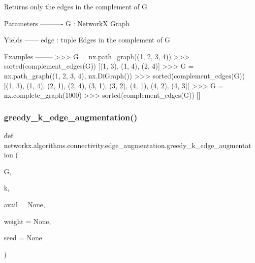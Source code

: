 \begin{DoxyVerb}Returns only the edges in the complement of G

Parameters
----------
G : NetworkX Graph

Yields
------
edge : tuple
    Edges in the complement of G

Examples
--------
>>> G = nx.path_graph((1, 2, 3, 4))
>>> sorted(complement_edges(G))
[(1, 3), (1, 4), (2, 4)]
>>> G = nx.path_graph((1, 2, 3, 4), nx.DiGraph())
>>> sorted(complement_edges(G))
[(1, 3), (1, 4), (2, 1), (2, 4), (3, 1), (3, 2), (4, 1), (4, 2), (4, 3)]
>>> G = nx.complete_graph(1000)
>>> sorted(complement_edges(G))
[]
\end{DoxyVerb}
 \mbox{\label{namespacenetworkx_1_1algorithms_1_1connectivity_1_1edge__augmentation_ac83e34bbae10a9475ed1ebdd7f31981e}} 
\subsubsection{\texorpdfstring{greedy\+\_\+k\+\_\+edge\+\_\+augmentation()}{greedy\_k\_edge\_augmentation()}}
{\footnotesize\ttfamily def networkx.\+algorithms.\+connectivity.\+edge\+\_\+augmentation.\+greedy\+\_\+k\+\_\+edge\+\_\+augmentation (\begin{DoxyParamCaption}\item[{}]{G,  }\item[{}]{k,  }\item[{}]{avail = {\ttfamily None},  }\item[{}]{weight = {\ttfamily None},  }\item[{}]{seed = {\ttfamily None} }\end{DoxyParamCaption})}

